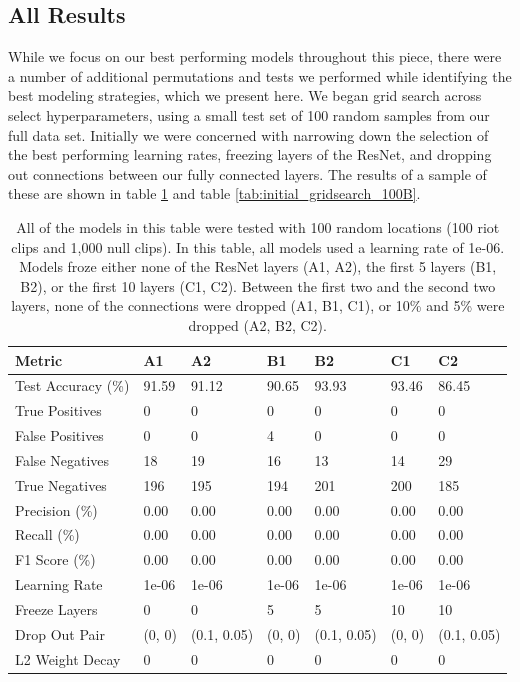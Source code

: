 \subsection{All Results} \label{large_table_of_results}
While we focus on our best performing models throughout this piece, there were a number of additional permutations and tests we performed while identifying the best modeling strategies, which we present here.  We began grid search across select hyperparameters, using a small test set of 100 random samples from our full data set.  Initially we were concerned with narrowing down the selection of the best performing learning rates, freezing layers of the ResNet, and dropping out connections between our fully connected layers.  The results of a sample of these are shown in table \ref{tab:initial_gridsearch_100A} and table \ref{tab:initial_gridsearch_100B}.  

\begin{table}
\centering
\begin{tabular}{|l|l|l|l|l|l|l|}
\hline
Metric & A1 & A2 & B1 & B2 & C1 & C2 \\ \hline
\hline
Test Accuracy (\%) & 91.59 & 91.12 & 90.65 & 93.93 & 93.46 & 86.45 \\\hline
\hline
True Positives & 0 & 0 & 0 & 0 & 0 & 0 \\ \hline
False Positives & 0 & 0 & 4 & 0 & 0 & 0 \\ \hline
False Negatives & 18 & 19 & 16 & 13 & 14 & 29 \\ \hline
True Negatives & 196 & 195 & 194 & 201 & 200 & 185 \\ \hline
\hline
Precision (\%) & 0.00 & 0.00 & 0.00 & 0.00 & 0.00 & 0.00 \\ \hline
Recall (\%) & 0.00 & 0.00 & 0.00 & 0.00 & 0.00 & 0.00 \\ \hline
F1 Score (\%) & 0.00 & 0.00 & 0.00 & 0.00 & 0.00 & 0.00 \\ \hline
\hline
Learning Rate & 1e-06 & 1e-06 & 1e-06 & 1e-06 & 1e-06 & 1e-06 \\ \hline
Freeze Layers & 0 & 0 & 5 & 5 & 10 & 10 \\ \hline
Drop Out Pair & (0, 0) & (0.1, 0.05) & (0, 0) & (0.1, 0.05) & (0, 0) & (0.1, 0.05) \\ \hline
L2 Weight Decay & 0 & 0 & 0 & 0 & 0 & 0 \\ \hline
\hline
\end{tabular}
\caption{All of the models in this table were tested with 100 random locations (100 riot clips and 1,000 null clips). In this table, all models used a learning rate of 1e-06. Models froze either none of the ResNet layers (A1, A2), the first 5 layers (B1, B2), or the first 10 layers (C1, C2). Between the first two and the second two layers, none of the connections were dropped (A1, B1, C1), or 10\% and 5\% were dropped (A2, B2, C2). }


\label{tab:initial_gridsearch_100A}
\end{table}



